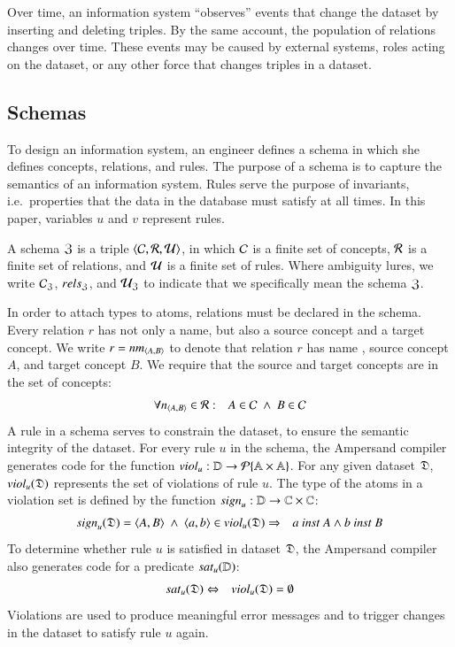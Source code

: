 \documentclass{elsarticle}
\begin{document}
   Over time, an information system ``observes'' events that change the dataset by inserting and deleting triples.
   By the same account, the population of relations changes over time.
   These events may be caused by external systems, roles acting on the dataset, or any other force that changes triples in a dataset.

\subsection{Schemas}
\label{sct:Schemas}
   To design an information system, an engineer defines a schema in which she defines concepts, relations, and rules.
   The purpose of a schema is to capture the semantics of an information system.
   Rules serve the purpose of invariants,
   i.e.\ properties that the data in the database must satisfy at all times.
   In this paper, variables $u$ and $v$ represent rules.

   A schema $\mathfrak{Z}$ is a triple $\langle{\mathcal{C}},{\mathcal{R}},{\mathcal{U}}\rangle$,
   in which $\mathcal{C}$ is a finite set of concepts,
   $\mathcal{R}$ is a finite set of relations,
   and $\mathcal{U}$ is a finite set of rules.
   Where ambiguity lures, we write $\mathcal{C}_{\mathfrak{Z}}$, $rels_{\mathfrak{Z}}$, and $\mathcal{U}_{\mathfrak{Z}}$ to indicate that we specifically mean the schema $\mathfrak{Z}$.

   In order to attach types to atoms, relations must be declared in the schema.
   Every relation $r$ has not only a name, but also a source concept and a target concept.
   We write $r=\text{\it nm\/}_{\langle{A},{B}\rangle}$ to denote that relation $r$ has name , source concept $A$, and target concept $B$.
   We require that the source and target concepts are in the set of concepts:
\begin{eqnarray}
   \forall\declare{n}{A}{B}\in\rels&:&A\in\concepts\ \wedge\ B\in\concepts
   \label{eqn:relationsIntroduceConcepts}
\end{eqnarray}
   A rule in a schema serves to constrain the dataset,
   to ensure the semantic integrity of the dataset.
   For every rule $u$ in the schema, the Ampersand compiler generates code
   for the function $\text{\it viol\/}_u : \mathbb{D}\rightarrow\cal{P}\{\mathbb{A}\times\mathbb{A}\}$.
   For any given dataset $\mathfrak{D}$, $\text{\it viol\/}_{u}(\mathfrak{D})$ represents the set of violations of rule $u$.
   The type of the atoms in a violation set is defined by the function $\text{\it sign\/}_{u} : \mathbb{D}\rightarrow\mathbb{C}\times\mathbb{C}$:
\begin{eqnarray}
   \sign{u}{\dataset}=\pair{A}{B}\ \wedge\ \pair{a}{b}\in\viol{u}{\dataset}&\Rightarrow&a\ \inst\ A\wedge b\ \inst\ B
   \label{eqn:typed violations}
\end{eqnarray}
   To determine whether rule $u$ is satisfied in dataset $\mathfrak{D}$,
   the Ampersand compiler also generates code for a predicate $\text{\it sat\/}_{u}(\mathbb{D})$:
\begin{eqnarray}
   \text{\it sat\/}_{u}(\mathfrak{D})&\Leftrightarrow&\text{\it viol\/}_{u}(\mathfrak{D})=\emptyset
   \label{eqn:sat}
\end{eqnarray}
   Violations are used to produce meaningful error messages and to trigger changes in the dataset to satisfy rule $u$ again.
\end{document}

